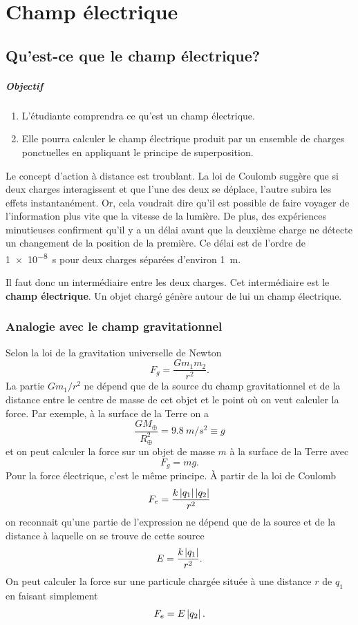 \chapter{Champ électrique}

\section{Qu'est-ce que le champ électrique?}



\paragraph{Objectif}
\begin{enumerate}
  \item L'étudiante comprendra ce qu'est un champ électrique.
  \item Elle pourra calculer le champ électrique produit par un ensemble de
    charges ponctuelles en appliquant le principe de superposition.
\end{enumerate}


  Le concept d'action à distance est troublant. La loi de Coulomb suggère que
  si deux charges interagissent et que l'une des deux se déplace, l'autre
  subira les effets instantanément. Or, cela voudrait dire qu'il est possible
  de faire voyager de l'information plus vite que la vitesse de la lumière. De
  plus, des expériences minutieuses confirment qu'il y a un délai avant que la
  deuxième charge ne détecte un changement de la position de la première. Ce
  délai est de l'ordre de \SI{1e-8}{s} pour deux charges séparées d'environ
  \SI{1}{m}.

  Il faut donc un intermédiaire entre les deux charges. Cet intermédiaire est
  le \textbf{champ électrique}. Un objet chargé génère autour de lui un
  champ électrique.


\subsection*{Analogie avec le champ gravitationnel}

Selon la loi de la gravitation universelle de Newton
\[
  F_g = \frac{Gm_1m_2}{r^2}.
\]
La partie $Gm_1 / r^2$ ne dépend que de la source du champ gravitationnel et de
la distance entre le centre de masse de cet objet et le point où on veut
calculer la force. Par exemple, à la surface de la Terre on a
\[
  \frac{GM_\oplus}{R_\oplus^2} = \SI{9.8}{m/s^2} \equiv g
\]
et on peut calculer la force sur un objet de masse $m$ à la surface de la Terre
avec
\[
  F_g = mg.
\]
Pour la force électrique, c'est le même principe. À partir de la loi de
Coulomb
\[
  F_e = \frac{k\left| q_1 \right|\left| q_2 \right|}{r^2}
\]
on reconnait qu'une partie de l'expression ne dépend que de la source et de la
distance à laquelle on se trouve de cette source
\[
  E = \frac{k\left| q_1 \right|}{r^2}.
\]
On peut calculer la force sur une particule chargée située à une distance $r$
de $q_1$ en faisant simplement
\[
  F_e = E\left| q_2 \right|.
\]




